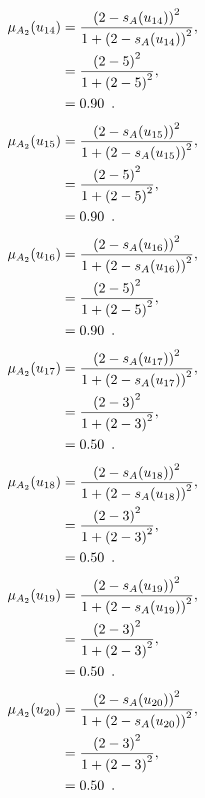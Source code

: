\documentclass[a4paper,openany]{book}
\begin{document}
				\begin{align}
					\mu_{A_2}(u_{14}) &= \frac{\left(2-s_A(u_{14})\right)^2}{1 + \left(2-s_A(u_{14})\right)^2} ,\\
					&= \frac{\left(2-5\right)^2}{1 + \left(2-5\right)^2} \notag ,\\
					&= 0.90 \enspace. \notag
				\end{align}
				\begin{align}
					\mu_{A_2}(u_{15}) &= \frac{\left(2-s_A(u_{15})\right)^2}{1 + \left(2-s_A(u_{15})\right)^2} ,\\
					&= \frac{\left(2-5\right)^2}{1 + \left(2-5\right)^2} \notag ,\\
					&= 0.90 \enspace. \notag
				\end{align}
				\begin{align}
					\mu_{A_2}(u_{16}) &= \frac{\left(2-s_A(u_{16})\right)^2}{1 + \left(2-s_A(u_{16})\right)^2} ,\\
					&= \frac{\left(2-5\right)^2}{1 + \left(2-5\right)^2} \notag ,\\
					&= 0.90 \enspace. \notag
				\end{align}
				\begin{align}
					\mu_{A_2}(u_{17}) &= \frac{\left(2-s_A(u_{17})\right)^2}{1 + \left(2-s_A(u_{17})\right)^2} ,\\
					&= \frac{\left(2-3\right)^2}{1 + \left(2-3\right)^2} \notag ,\\
					&= 0.50 \enspace. \notag
				\end{align}
				\begin{align}
					\mu_{A_2}(u_{18}) &= \frac{\left(2-s_A(u_{18})\right)^2}{1 + \left(2-s_A(u_{18})\right)^2} ,\\
					&= \frac{\left(2-3\right)^2}{1 + \left(2-3\right)^2} \notag ,\\
					&= 0.50 \enspace. \notag
				\end{align}
				\begin{align}
					\mu_{A_2}(u_{19}) &= \frac{\left(2-s_A(u_{19})\right)^2}{1 + \left(2-s_A(u_{19})\right)^2} ,\\
					&= \frac{\left(2-3\right)^2}{1 + \left(2-3\right)^2} \notag ,\\
					&= 0.50 \enspace. \notag
				\end{align}
				\begin{align}
					\mu_{A_2}(u_{20}) &= \frac{\left(2-s_A(u_{20})\right)^2}{1 + \left(2-s_A(u_{20})\right)^2} ,\\
					&= \frac{\left(2-3\right)^2}{1 + \left(2-3\right)^2} \notag ,\\
					&= 0.50 \enspace. \notag
				\end{align}
\end{document}
